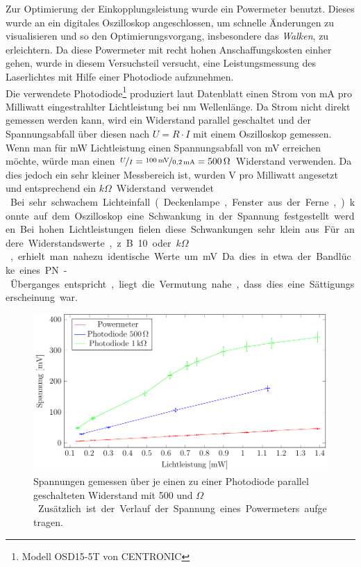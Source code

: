 
Zur Optimierung der Einkopplungsleistung wurde ein Powermeter benutzt. Dieses wurde an ein digitales Oszilloskop angeschlossen, um schnelle Änderungen zu visualisieren und so den Optimierungsvorgang, insbesondere das \textit{Walken}, zu erleichtern. Da diese Powermeter mit recht hohen Anschaffungskosten einher gehen, wurde in diesem Versuchsteil versucht, eine Leistungsmessung des Laserlichtes mit Hilfe einer Photodiode aufzunehmen.\\

Die verwendete Photodiode\footnote{Modell OSD15-5T von CENTRONIC\cite{farnell.com_osd15-5t_????}} produziert laut Datenblatt einen Strom von \unit[0,18-0,21]{mA} pro Milliwatt eingestrahlter Lichtleistung bei \unit[436]{nm} Wellenlänge. Da Strom nicht direkt gemessen werden kann, wird ein Widerstand parallel geschaltet und der Spannungsabfall über diesen nach $U=R\cdot I$ mit einem Oszilloskop gemessen. Wenn man für \unit[1]{mW} Lichtleistung einen Spannungsabfall von \unit[100]{mV} erreichen möchte, würde man einen $\nicefrac{U}{I}=\nicefrac{\unit[100]{mV}}{\unit[0,2]{mA}}=\unit[500]{\Omega}$ Widerstand verwenden. Da dies jedoch ein sehr kleiner Messbereich ist, wurden \unit[4]{V} pro Milliwatt angesetzt und entsprechend ein \unit[20]{$k\Omega$} Widerstand verwendet.\\

Bei sehr schwachem Lichteinfall (Deckenlampe, Fenster aus der Ferne, ...) konnte auf dem Oszilloskop eine Schwankung in der Spannung festgestellt werden. Bei hohen Lichtleistungen fielen diese Schwankungen sehr klein aus. Für andere Widerstandswerte, z.B. 10 oder \unit[100]{$k\Omega$}, erhielt man nahezu identische Werte um \unit[440]{mV}. Da dies in etwa der Bandlücke eines PN-Überganges entspricht, liegt die Vermutung nahe, dass dies eine Sättigungserscheinung war.

\begin{figure}[ht]
	\centering
	\includegraphics[width=1\linewidth]{graphs/fotodiode/diode.pdf}
	\caption[Vermessung einer Photodiode]{
		Spannungen gemessen über je einen zu einer Photodiode parallel geschalteten Widerstand mit 500 und \unit[1000]{$\Omega$}. Zusätzlich ist der Verlauf der Spannung eines Powermeters aufgetragen.
	}
	\label{fig:photodiode}
\end{figure}

